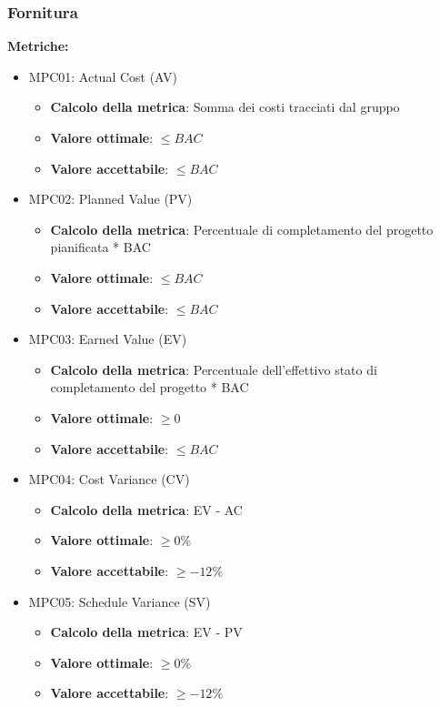 \documentclass[12pt]{article}
\begin{document}
\subsubsection{Fornitura}
\textbf{Metriche:}
\begin{itemize}
	\item MPC01: Actual Cost (AV)
	      \begin{itemize}
		      \item \textbf{Calcolo della metrica}: Somma dei costi tracciati dal gruppo
		      \item \textbf{Valore ottimale}: $\le BAC$
		      \item \textbf{Valore accettabile}: $\le BAC$
	      \end{itemize}
	\item MPC02: Planned Value (PV)
	      \begin{itemize}
		      \item \textbf{Calcolo della metrica}: Percentuale di completamento del progetto pianificata * BAC
		      \item \textbf{Valore ottimale}: $\le BAC$
		      \item \textbf{Valore accettabile}: $\le BAC$
	      \end{itemize}
	\item MPC03: Earned Value (EV)
	      \begin{itemize}
		      \item \textbf{Calcolo della metrica}: Percentuale dell'effettivo stato di completamento del progetto * BAC
		      \item \textbf{Valore ottimale}: $\ge 0$
		      \item \textbf{Valore accettabile}: $\le BAC$
	      \end{itemize}
	\item MPC04: Cost Variance (CV)
	      \begin{itemize}
		      \item \textbf{Calcolo della metrica}:  EV - AC
		      \item \textbf{Valore ottimale}: $\ge 0\%$
		      \item \textbf{Valore accettabile}: $\ge -12\%$
	      \end{itemize}
	\item MPC05: Schedule Variance (SV)
	      \begin{itemize}
		      \item \textbf{Calcolo della metrica}:  EV - PV
		      \item \textbf{Valore ottimale}: $\ge 0\%$
		      \item \textbf{Valore accettabile}: $\ge -12\%$
	      \end{itemize}


\end{itemize}
\end{document}
